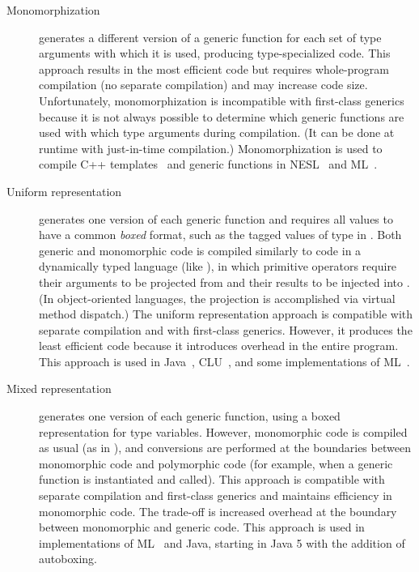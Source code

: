 \documentclass[7x10]{TimesAPriori_MIT}%
\numberwithin{theorem}{chapter}
\numberwithin{definition}{chapter}
\numberwithin{equation}{chapter}
\begin{document}
\begin{description}
\item[Monomorphization] generates a different version of a generic
  function for each set of type arguments with which it is used,
  producing type-specialized code. This approach results in the most
  efficient code but requires whole-program compilation (no separate
  compilation) and may increase code size.  Unfortunately,
  monomorphization is incompatible with first-class generics because
  it is not always possible to determine which generic functions are
  used with which type arguments during compilation. (It can be done
  at runtime with just-in-time compilation.)  Monomorphization is
  used to compile C++ templates~\citep{stroustrup88:_param_types} and
  generic functions in NESL~\citep{Blelloch:1993aa} and
  ML~\citep{Weeks:2006aa}.
  
\item[Uniform representation] generates one version of each generic
  function and requires all values to have a common \emph{boxed} format,
  such as the tagged values of type \CANYTY{} in \LangAny{}. Both
  generic and monomorphic code is compiled similarly to code in a
  dynamically typed language (like \LangDyn{}), in which primitive
  operators require their arguments to be projected from \CANYTY{} and
  their results to be injected into \CANYTY{}.  (In object-oriented
  languages, the projection is accomplished via virtual method
  dispatch.) The uniform representation approach is compatible with
  separate compilation and with first-class generics.  However, it
  produces the least efficient code because it introduces overhead in
  the entire program. This approach is used in
  Java~\citep{Bracha:1998fk},
  CLU~\citep{liskov79:_clu_ref,Liskov:1993dk}, and some implementations
  of ML~\citep{Cardelli:1984aa,Appel:1987aa}.
  
\item[Mixed representation] generates one version of each generic
  function, using a boxed representation for type variables. However,
  monomorphic code is compiled as usual (as in \LangLam{}), and
  conversions are performed at the boundaries between monomorphic code
  and polymorphic code (for example, when a generic function is instantiated
  and called). This approach is compatible with separate compilation
  and first-class generics and maintains efficiency in monomorphic
  code. The trade-off is increased overhead at the boundary between
  monomorphic and generic code.  This approach is used in
  implementations of ML~\citep{Leroy:1992qb} and Java, starting in
  Java 5 with the addition of autoboxing.
  

\end{description}
\end{document}
